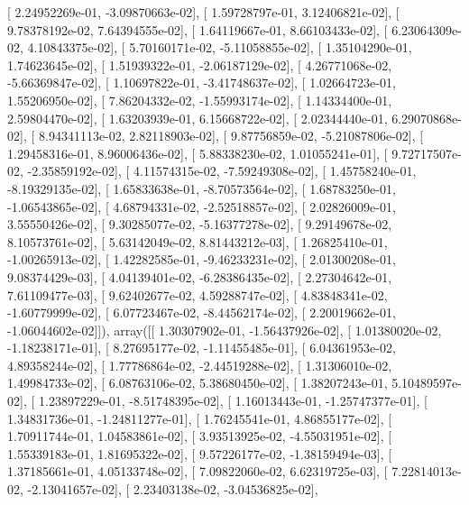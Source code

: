 \documentclass{article}
\begin{document}
       [  2.24952269e-01,  -3.09870663e-02],
       [  1.59728797e-01,   3.12406821e-02],
       [  9.78378192e-02,   7.64394555e-02],
       [  1.64119667e-01,   8.66103433e-02],
       [  6.23064309e-02,   4.10843375e-02],
       [  5.70160171e-02,  -5.11058855e-02],
       [  1.35104290e-01,   1.74623645e-02],
       [  1.51939322e-01,  -2.06187129e-02],
       [  4.26771068e-02,  -5.66369847e-02],
       [  1.10697822e-01,  -3.41748637e-02],
       [  1.02664723e-01,   1.55206950e-02],
       [  7.86204332e-02,  -1.55993174e-02],
       [  1.14334400e-01,   2.59804470e-02],
       [  1.63203939e-01,   6.15668722e-02],
       [  2.02344440e-01,   6.29070868e-02],
       [  8.94341113e-02,   2.82118903e-02],
       [  9.87756859e-02,  -5.21087806e-02],
       [  1.29458316e-01,   8.96006436e-02],
       [  5.88338230e-02,   1.01055241e-01],
       [  9.72717507e-02,  -2.35859192e-02],
       [  4.11574315e-02,  -7.59249308e-02],
       [  1.45758240e-01,  -8.19329135e-02],
       [  1.65833638e-01,  -8.70573564e-02],
       [  1.68783250e-01,  -1.06543865e-02],
       [  4.68794331e-02,  -2.52518857e-02],
       [  2.02826009e-01,   3.55550426e-02],
       [  9.30285077e-02,  -5.16377278e-02],
       [  9.29149678e-02,   8.10573761e-02],
       [  5.63142049e-02,   8.81443212e-03],
       [  1.26825410e-01,  -1.00265913e-02],
       [  1.42282585e-01,  -9.46233231e-02],
       [  2.01300208e-01,   9.08374429e-03],
       [  4.04139401e-02,  -6.28386435e-02],
       [  2.27304642e-01,   7.61109477e-03],
       [  9.62402677e-02,   4.59288747e-02],
       [  4.83848341e-02,  -1.60779999e-02],
       [  6.07723467e-02,  -8.44562174e-02],
       [  2.20019662e-01,  -1.06044602e-02]]), array([[  1.30307902e-01,  -1.56437926e-02],
       [  1.01380020e-02,  -1.18238171e-01],
       [  8.27695177e-02,  -1.11455485e-01],
       [  6.04361953e-02,   4.89358244e-02],
       [  1.77786864e-02,  -2.44519288e-02],
       [  1.31306010e-02,   1.49984733e-02],
       [  6.08763106e-02,   5.38680450e-02],
       [  1.38207243e-01,   5.10489597e-02],
       [  1.23897229e-01,  -8.51748395e-02],
       [  1.16013443e-01,  -1.25747377e-01],
       [  1.34831736e-01,  -1.24811277e-01],
       [  1.76245541e-01,   4.86855177e-02],
       [  1.70911744e-01,   1.04583861e-02],
       [  3.93513925e-02,  -4.55031951e-02],
       [  1.55339183e-01,   1.81695322e-02],
       [  9.57226177e-02,  -1.38159494e-03],
       [  1.37185661e-01,   4.05133748e-02],
       [  7.09822060e-02,   6.62319725e-03],
       [  7.22814013e-02,  -2.13041657e-02],
       [  2.23403138e-02,  -3.04536825e-02],
\end{document}
